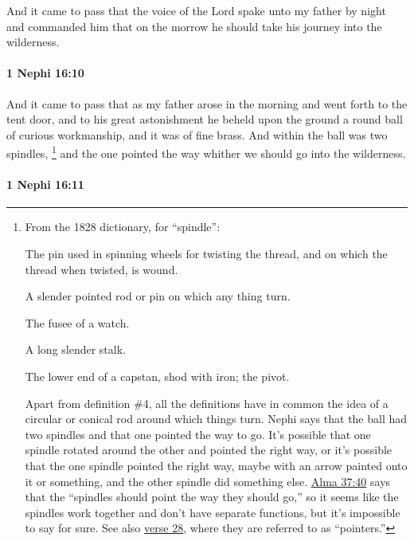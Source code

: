 			And it came to pass that the voice of the Lord spake unto my father by night
			and commanded him that on the morrow
			he should take his journey into the wilderness.

		\paragraph{1 Nephi 16:10} %
			\label{1NEPHI-16-10}

			And it came to pass that as my father arose in the morning
			and went forth to the tent door,
			and to his great astonishment he beheld upon the ground
			a round ball of curious workmanship,
			and it was of fine brass.
			And within the ball was two spindles,%
				\footnote{%
					\label{1NEPHI-16-10-NOTE-spindles}%
					From the 1828 dictionary, for ``spindle'':
					\begin{compactenum}
						\item The pin used in spinning wheels for twisting the thread, and on which the thread when twisted, is wound.
						\item A slender pointed rod or pin on which any thing turn.
						\item The fusee of a watch.
						\item A long slender stalk.
						\item The lower end of a capstan, shod with iron; the pivot.
					\end{compactenum}
					Apart from definition \#4, all the definitions have in common the idea of a circular or conical rod around which things turn. Nephi says that the ball had two spindles and that one pointed the way to go. It's possible that one spindle rotated around the other and pointed the right way, or it's possible that the one spindle pointed the right way, maybe with an arrow painted onto it or something, and the other spindle did something else. \hyperref[ALMA-37-40]{Alma 37:40} says that the ``spindles should point the way they should go,'' so it seems like the spindles work together and don't have separate functions, but it's impossible to say for sure. See also \hyperref[1NEPHI-16-28]{verse 28}, where they are referred to as ``pointers.''
					}
			and the one pointed the way whither we should go into the wilderness.

		\paragraph{1 Nephi 16:11} %
			\label{1NEPHI-16-11}

